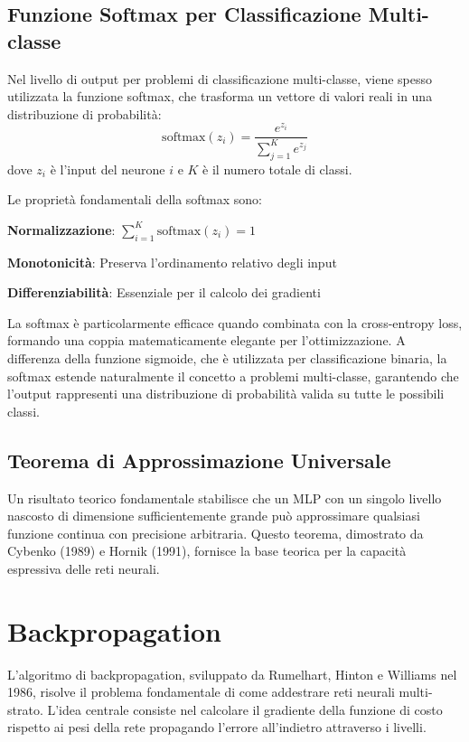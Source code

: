 \subsection{Funzione Softmax per Classificazione Multi-classe}
Nel livello di output per problemi di classificazione multi-classe, viene spesso utilizzata la funzione softmax, che trasforma un vettore di valori reali in una distribuzione di probabilità:
\[
\text{softmax}(z_i) = \frac{e^{z_i}}{\sum_{j=1}^K e^{z_j}}
\]
dove $z_i$ è l'input del neurone $i$ e $K$ è il numero totale di classi.

Le proprietà fondamentali della softmax sono:
\begin{compactitemize}
\item \textbf{Normalizzazione}: $\sum_{i=1}^K \text{softmax}(z_i) = 1$
\item \textbf{Monotonicità}: Preserva l'ordinamento relativo degli input
\item \textbf{Differenziabilità}: Essenziale per il calcolo dei gradienti
\end{compactitemize}
La softmax è particolarmente efficace quando combinata con la cross-entropy loss, formando una coppia matematicamente elegante per l'ottimizzazione. A differenza della funzione sigmoide, che è utilizzata per classificazione binaria, la softmax estende naturalmente il concetto a problemi multi-classe, garantendo che l'output rappresenti una distribuzione di probabilità valida su tutte le possibili classi.

\subsection{Teorema di Approssimazione Universale}
Un risultato teorico fondamentale stabilisce che un MLP con un singolo livello nascosto di dimensione sufficientemente grande può approssimare qualsiasi funzione continua con precisione arbitraria. Questo teorema, dimostrato da Cybenko (1989) e Hornik (1991), fornisce la base teorica per la capacità espressiva delle reti neurali.



\section{Backpropagation}
L'algoritmo di backpropagation, sviluppato da Rumelhart, Hinton e Williams nel 1986, risolve il problema fondamentale di come addestrare reti neurali multi-strato. L'idea centrale consiste nel calcolare il gradiente della funzione di costo rispetto ai pesi della rete propagando l'errore all'indietro attraverso i livelli.


